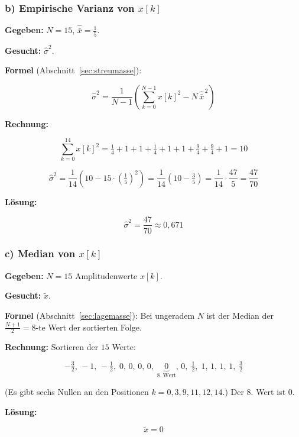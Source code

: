\subsubsection*{b) Empirische Varianz von $x[k]$}

\begin{beispiel}

\textbf{Gegeben:} $N = 15$, $\hat{\bar{x}} = \tfrac15$.

\textbf{Gesucht:} $\hat{\sigma}^2$.

\textbf{Formel} (Abschnitt~\ref{sec:streumasse}):

$$
\hat{\sigma}^2 = \frac{1}{N-1}\left( \sum_{k=0}^{N-1} x[k]^2 - N\,\hat{\bar{x}}^{\,2} \right)
$$

\textbf{Rechnung:}

$$
\sum_{k=0}^{14} x[k]^2
= \tfrac14 + 1 + 1 + \tfrac14 + 1 + 1 + \tfrac94 + \tfrac94 + 1 = 10
$$

$$
\hat{\sigma}^2 = \frac{1}{14}\left( 10 - 15\cdot\left(\tfrac15\right)^2 \right)
= \frac{1}{14}\left( 10 - \tfrac{3}{5} \right)
= \frac{1}{14}\cdot \frac{47}{5}
= \frac{47}{70}
$$

\textbf{Lösung:}

$$
\boxed{\;\hat{\sigma}^2 = \frac{47}{70} \approx 0{,}671\;}
$$

\end{beispiel}

\subsubsection*{c) Median von $x[k]$}

\begin{beispiel}

\textbf{Gegeben:} $N = 15$ Amplitudenwerte $x[k]$.

\textbf{Gesucht:} $\tilde{x}$.

\textbf{Formel} (Abschnitt~\ref{sec:lagemasse}): Bei ungeradem $N$ ist der Median
der $\tfrac{N+1}{2} = 8$-te Wert der sortierten Folge.

\textbf{Rechnung:} Sortieren der $15$ Werte:

$$
-\tfrac32,\, -1,\, -\tfrac12,\; 0,\,0,\,0,\,0,\;
\underbrace{0}_{8.\ \text{Wert}},\, 0,\; \tfrac12,\; 1,\,1,\,1,\,1,\; \tfrac32
$$

(Es gibt sechs Nullen an den Positionen $k = 0,3,9,11,12,14$.) Der $8.$ Wert ist
$0$.

\textbf{Lösung:}

$$
\boxed{\;\tilde{x} = 0\;}
$$

\end{beispiel}

